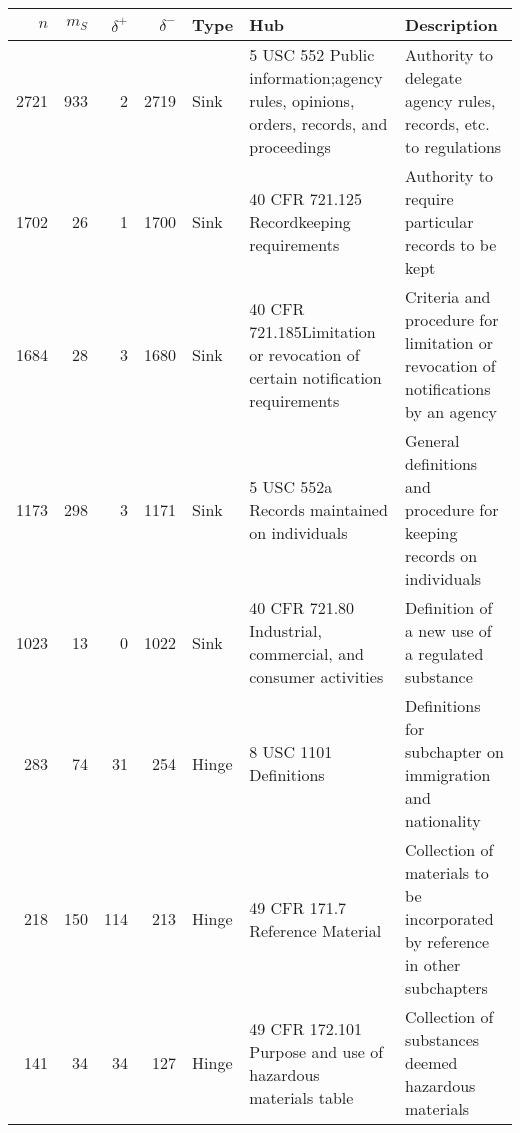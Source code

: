 \begin{tabular}{rrrrlp{}p{}}
\toprule
   $n$ &   $m_S$ &   $\delta^+$ &   $\delta^-$ & \textbf{Type}   & \textbf{Hub}                                                                      & \textbf{Description}   \\
\midrule
  2721 &     933 &            2 &         2719 & Sink            & 5 USC 552 Public information;\newline agency rules, opinions, orders, records, and proceedings                            & Authority to delegate agency rules, records, etc. to regulations                       \\
  \rowcolor{lightgray!30}1702 &      26 &            1 &         1700 & Sink            & 40 CFR 721.125 Recordkeeping requirements                                   & Authority to require particular records to be kept                        \\
  \rowcolor{lightgray!30}1684 &      28 &            3 &         1680 & Sink            & 40 CFR 721.185\newline Limitation or revocation of certain notification requirements& Criteria and procedure for limitation or revocation of notifications by an agency                        \\
  1173 &     298 &            3 &         1171 & Sink            & 5 USC 552a Records maintained on individuals                          & General definitions and procedure for keeping records on individuals                        \\
  \rowcolor{lightgray!30}1023 &      13 &            0 &         1022 & Sink            & 40 CFR 721.80 Industrial, commercial, and consumer activities                & Definition of a new use of a regulated substance                        \\
   283 &      74 &           31 &          254 & Hinge           & 8 USC 1101 Definitions                                          & Definitions for subchapter on immigration and nationality                         \\
   \rowcolor{lightgray!30}218 &     150 &          114 &          213 & Hinge           & 49 CFR 171.7 Reference Material                                              & Collection of materials to be incorporated by reference in other subchapters                       \\
   \rowcolor{lightgray!30}141 &      34 &           34 &          127 & Hinge           & 49 CFR 172.101 Purpose and use of hazardous materials table                  & Collection of substances deemed hazardous materials                       \\

\end{tabular}
